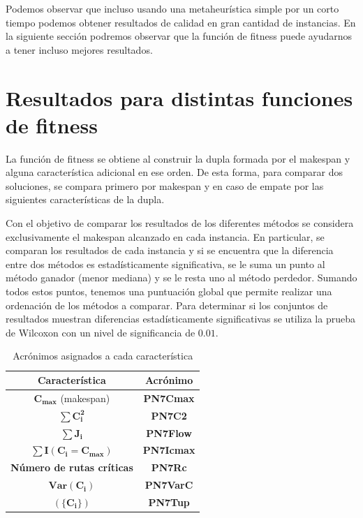Podemos observar que incluso usando una metaheurística simple por un corto tiempo podemos obtener resultados de calidad en gran cantidad de instancias. 
%
En la siguiente sección podremos observar que la función de fitness puede ayudarnos a tener incluso mejores resultados.

\section{Resultados para distintas funciones de fitness}
La función de fitness se obtiene al construir la dupla formada por el makespan y alguna característica adicional en ese orden. 
%
De esta forma, para comparar dos soluciones, se compara primero por makespan y en caso de empate por las siguientes características
de la dupla.

Con el objetivo de comparar los resultados de los diferentes métodos se considera exclusivamente el makespan alcanzado en cada instancia.
%
En particular, se comparan los resultados de cada instancia y si se encuentra que la diferencia entre dos métodos es estadísticamente significativa, 
se le suma un punto al método ganador (menor mediana) y se le resta uno al método perdedor. 
%
Sumando todos estos puntos, tenemos una puntuación global que permite realizar una ordenación de los métodos a comparar.
%
Para determinar si los conjuntos de resultados muestran diferencias estadísticamente significativas se utiliza la prueba de 
Wilcoxon con un nivel de significancia de $0.01$. 

\begin{table}[hbtp]
    \centering
\begin{tabular}{@{}cc@{}}
Característica                    & Acrónimo       \\ \hline \hline
$\mathbf{C_{max}}$ (makespan)     & \textbf{PN7Cmax}   \\\midrule
$\mathbf{\sum C_i^2}$             & \textbf{PN7C2}    \\\midrule
$\mathbf{\sum J_i}$               & \textbf{PN7Flow}  \\\midrule
$\mathbf{\sum I(C_i=C_{max})}$    & \textbf{PN7Icmax} \\\midrule
\textbf{Número de rutas críticas} & \textbf{PN7Rc}    \\\midrule
$\mathbf{Var(C_i)}$               & \textbf{PN7VarC}  \\\midrule
$\mathbf{(\{C_i\})}$              & \textbf{PN7Tup}    \\\midrule
\end{tabular}
    \caption{Acrónimos asignados a cada característica}
    \label{tab:caracter}
\end{table}

